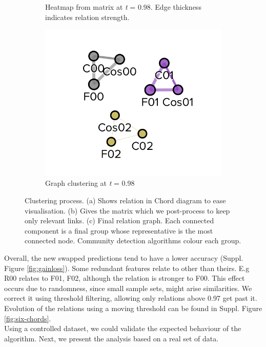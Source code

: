 \begin{figure}[!h]
\begin{subfigure}[b]{0.3\linewidth}
		\caption{Heatmap from matrix at \emph{t} = 0.98. Edge thickness indicates relation strength.}
	\end{subfigure}
	\hfill
	\begin{subfigure}[b]{0.3\linewidth}
		\includegraphics[width=\linewidth]{Minor Thesis/figures/graphs/graph-toy.png}
		\caption{Graph clustering at \emph{t} = 0.98}
	\end{subfigure}
	\caption{Clustering process. (a) Shows relation in Chord diagram to ease visualisation. (b) Gives the matrix which we post-process to keep only relevant links. (c) Final relation graph. Each connected component is a final group whose representative is the most connected node. Community detection algorithms colour each group.}
	\label{fig:triade}
\end{figure}

Overall, the new swapped predictions tend to have a lower accuracy (Suppl. Figure \ref{fig:gainloss}). Some redundant features relate to other than theirs. E.g R00 relates to F01, F02, although the relation is stronger to F00. This effect occurs due to randomness, since small sample sets, might arise similarities. We correct it using threshold filtering, allowing only relations above 0.97 get past it. Evolution of the relations using a moving threshold can be found in Suppl. Figure \ref{fig:six-chords}.
\\

Using a controlled dataset, we could validate the expected behaviour of the algorithm. Next, we present the analysis based on a real set of data.


